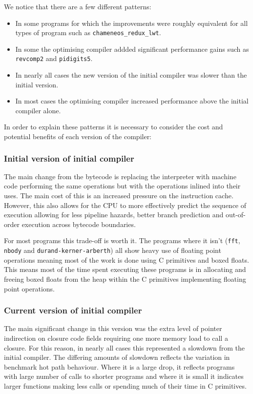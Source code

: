 We notice that there are a few different patterns:

\begin{itemize}
      \item In some programs for which the improvements were roughly equivalent for all types of
            program
            such as \texttt{chameneos\_redux\_lwt}.
      \item In some the optimising compiler addded significant performance gains such as
            \texttt{revcomp2} and \texttt{pidigits5}.
      \item In nearly all cases the new version of the initial compiler was slower than the initial
            version.
      \item In most cases the optimising compiler increased performance above the initial compiler
            alone.
\end{itemize}

In order to explain these patterns it is necessary to consider the cost and potential benefits of
each version of the compiler:

\subsubsection{Initial version of initial compiler}

The main change from the bytecode is replacing the interpreter with machine code performing the
same
operations but with the operations inlined into their uses. The main cost of this is an increased
pressure on the instruction cache. However, this also allows for the CPU to more effectively
predict
the sequence of execution allowing for less pipeline hazards, better branch prediction and
out-of-order execution across bytecode boundaries.

For most programs this trade-off is worth it.  The programs where it isn't (\texttt{fft},
\texttt{nbody} and \texttt{durand-kerner-arberth}) all show heavy use of floating point operations
meaning most of the work is done using C primitives and boxed floats. This means most of the time
spent executing these programs is in allocating and freeing boxed floats from the heap within the C
primitives implementing floating point operations.

\subsubsection{Current version of initial compiler}

The main significant change in this version was the extra level of pointer indirection on closure
code fields requiring one more memory load to call a closure. For this reason, in nearly all cases
this represented a slowdown from the initial compiler. The differing amounts of slowdown reflects
the variation in benchmark hot path behaviour. Where it is a large drop, it reflects programs with
large number of calls to shorter programs and where it is small it indicates larger functions
making less calls or spending much of their time in C primitives.

